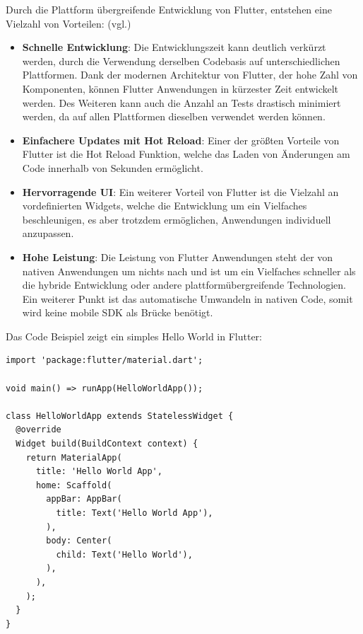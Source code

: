 Durch die Plattform übergreifende Entwicklung von Flutter, entstehen eine Vielzahl von Vorteilen: (vgl.\cite{Flutter-Vorteile})
\begin{itemize}
\item \textbf{Schnelle Entwicklung}:
Die Entwicklungszeit kann deutlich verkürzt werden, durch die Verwendung derselben Codebasis auf unterschiedlichen Plattformen. Dank der modernen Architektur von Flutter, der hohe Zahl von Komponenten, können Flutter Anwendungen in kürzester Zeit entwickelt werden. Des Weiteren kann auch die Anzahl an Tests drastisch minimiert werden, da auf allen Plattformen dieselben verwendet werden können.

\item \textbf{Einfachere Updates mit Hot Reload}:
Einer der größten Vorteile von Flutter ist die Hot Reload Funktion, welche das Laden von Änderungen am Code innerhalb von Sekunden ermöglicht.

\item \textbf{Hervorragende UI}:
Ein weiterer Vorteil von Flutter ist die Vielzahl an vordefinierten Widgets, welche die Entwicklung um ein Vielfaches beschleunigen, es aber trotzdem ermöglichen, Anwendungen individuell anzupassen.

\item \textbf{Hohe Leistung}:
Die Leistung von Flutter Anwendungen steht der von nativen Anwendungen um nichts nach und ist um ein Vielfaches schneller als die hybride Entwicklung oder andere plattformübergreifende Technologien. Ein weiterer Punkt ist das automatische Umwandeln in nativen Code, somit wird keine mobile SDK als Brücke benötigt.
\end{itemize}

\newpage

Das Code Beispiel zeigt ein simples Hello World in Flutter:

\begin{lstlisting}[style=flutterListingStyle,caption={Hello World - Flutter},label={lst:fluttermain}]
import 'package:flutter/material.dart';

void main() => runApp(HelloWorldApp());

class HelloWorldApp extends StatelessWidget {
  @override
  Widget build(BuildContext context) {
    return MaterialApp(
      title: 'Hello World App',
      home: Scaffold(
        appBar: AppBar(
          title: Text('Hello World App'),
        ),
        body: Center(
          child: Text('Hello World'),
        ),
      ),
    );
  }
}
\end{lstlisting}

